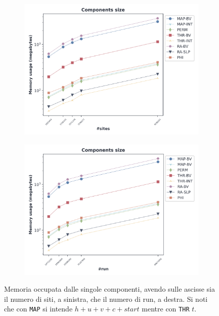\begin{figure}
  \centering
  \begin{subfigure}{.5\textwidth}
    \centering
    \includegraphics[width=\linewidth]{img/comp_sites.png}
  \end{subfigure}%
  \begin{subfigure}{.5\textwidth}
    \centering
    \includegraphics[width=\linewidth]{img/comp_runs.png}
  \end{subfigure}
  \caption{Memoria occupata dalle singole componenti, avendo sulle ascisse sia
    il numero di siti, a sinistra, che il numero di run, a destra. Si noti che
    con \texttt{MAP} si intende $h+u+v+c+start$ mentre con \texttt{THR} $t$. }
  \label{fig:comp}
\end{figure}
